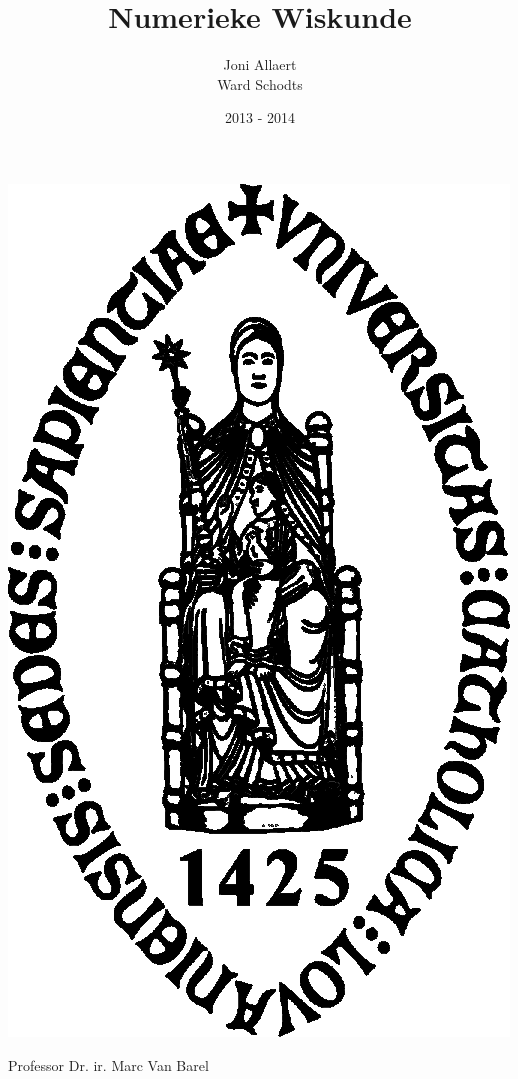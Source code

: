 \documentclass[11pt,a4paper]{article}
\begin{document}
\begin{titlepage}
\title{\Huge Numerieke Wiskunde}
\author{Joni Allaert\\
		Ward Schodts\\
		}

\date{2013 - 2014}
\maketitle
\thispagestyle{empty}

\begin{center}

\includegraphics[scale=0.4]{KULzwart.png}

\end{center}
\begin{center}
\Large Professor Dr. ir. Marc Van Barel
\vfill
\end{center}
\end{titlepage}
\end{document}
